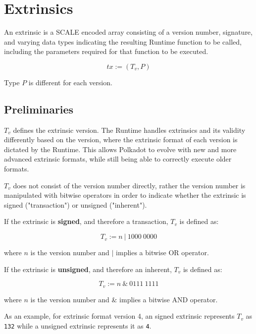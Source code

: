 \newpage
\section{Extrinsics}

An extrinsic is a SCALE encoded array consisting of a version number,
signature, and varying data types indicating the resulting Runtime function to
be called, including the parameters required for that function to be executed.
\newline

\[
    tx := (T_v, P)
\]

Type $P$ is different for each version.

\subsection{Preliminaries}

\begin{definition}
    \label{defn-extrinsic-version}
    $T_v$ defines the extrinsic version. The Runtime handles extrinsics and
    its validity differently based on the version, where the extrinsic format
    of each version is dictated by the Runtime. This allows Polkadot to evolve
    with new and more advanced extrinsic formats, while still being able to
    correctly execute older formats.
    \newline

    $T_v$ does not consist of the version number directly, rather the version
    number is manipulated with bitwise operators in order to indicate whether
    the extrinsic is signed ("transaction") or unsigned ("inherent").
    \newline

    If the extrinsic is \textbf{signed}, and therefore a transaction, $T_v$ is
    defined as:

    \[
        T_v := n \ | \ 1000 \ 0000
    \]

    where $n$ is the version number and $|$ implies a bitwise OR operator.
    \newline

    If the extrinsic is \textbf{unsigned}, and therefore an inherent, $T_v$ is
    defined as:

    \[
        T_v := n \ \& \ 0111 \ 1111
    \]

    where $n$ is the version number and $\&$ implies a bitwise AND operator.
    \newline

    As an example, for extrinsic format version 4, an signed extrinsic
    represents $T_v$ as \verb|132| while a unsigned extrinsic represents it as
    \verb|4|.
\end{definition}

